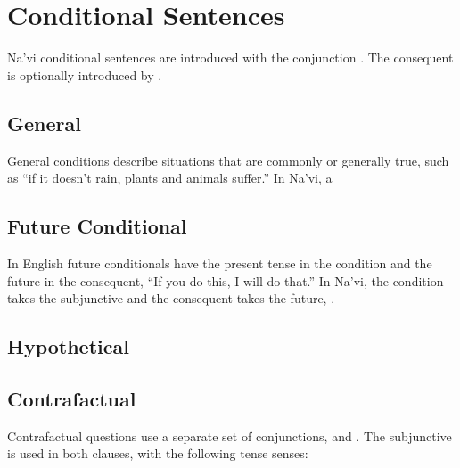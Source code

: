 {\section{Conditional Sentences}
\noindent Na'vi conditional sentences are introduced with the
conjunction  .  The consequent is optionally introduced
by  .
\label{syn:conditionals}

\subsection{General} General conditions describe situations that are
commonly or generally true, such as ``if it doesn't rain, plants and
animals suffer.''  In Na'vi, a   

\subsection{Future Conditional} In English future conditionals have
the present tense in the condition and the future in the consequent,
``If you do this, I will do that.''  In Na'vi, the condition takes the
subjunctive and the consequent takes the future,  . 

\subsection{Hypothetical} 

\subsection{Contrafactual} Contrafactual questions use a separate set
of conjunctions,   and  .  The subjunctive
is used in both clauses, with the following tense senses:

}
